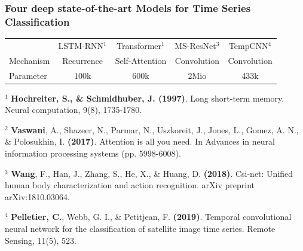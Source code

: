 

\begin{frame}
\frametitle{Four deep state-of-the-art Models for Time Series Classification}

\centering\begin{tabular}{lcccc}
	\toprule
	& LSTM-RNN$^1$ & Transformer$^1$ & MS-ResNet$^3$ & TempCNN$^4$ \\
	\cmidrule(lr){2-2}\cmidrule(lr){3-3}\cmidrule(lr){4-4}\cmidrule(lr){5-5}
	Mechanism & Recurrence & Self-Attention & Convolution & Convolution \\
	Parameter & 100k & 600k & 2Mio & 433k \\
	\bottomrule
\end{tabular}

\vspace{4em}

{\footnotesize\raggedright

$^1$ \textbf{Hochreiter, S., \& Schmidhuber, J. (1997)}. Long short-term memory. Neural computation, 9(8), 1735-1780.

$^2$ \textbf{Vaswani}, A., Shazeer, N., Parmar, N., Uszkoreit, J., Jones, L., Gomez, A. N., \& Polosukhin, I. \textbf{(2017)}. Attention is all you need. In Advances in neural information processing systems (pp. 5998-6008).

$^3$ \textbf{Wang}, F., Han, J., Zhang, S., He, X., \& Huang, D. \textbf{(2018)}. Csi-net: Unified human body characterization and action recognition. arXiv preprint arXiv:1810.03064.

$^4$ \textbf{Pelletier, C.}, Webb, G. I., \& Petitjean, F. \textbf{(2019)}. Temporal convolutional neural network for the classification of satellite image time series. Remote Sensing, 11(5), 523.

}

\end{frame}


